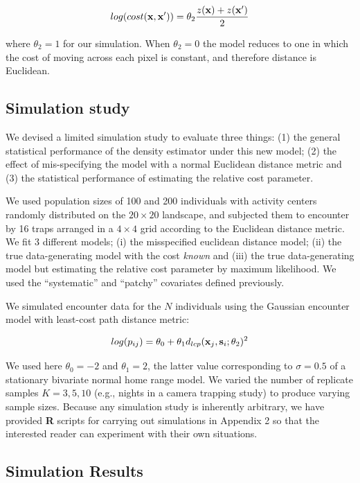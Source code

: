 \documentclass[12pt]{article}
\begin{document}
\begin{spacing}{1.8}
\[
 log(cost({\bf x},{\bf x}'))=  \theta_2 \frac{z({\bf x}) + z({\bf x}')}{2}
\]

{\flushleft where} $\theta_2 = 1$ for our simulation.
When $\theta_2=0$ the
model reduces to one in which the cost of moving across each pixel is
constant, and therefore distance is Euclidean.

\subsection{Simulation study}

We devised a limited simulation study to evaluate three things: (1)
the general statistical performance of the density estimator under
this new model; (2) the effect of mis-specifying the model with a
normal Euclidean distance metric and (3) the statistical performance
of estimating the relative cost parameter.

We used population sizes of 100 and 200 individuals with activity
centers randomly distributed on the $20 \times 20$ landscape, and subjected them
to encounter by 16 traps arranged in a $4\times 4$ grid according to
the Euclidean distance metric. We fit 3 different models; (i) the
misspecified euclidean distance model; (ii) the true data-generating
model with the cost {\it known} and (iii) the true
data-generating model but estimating the relative cost parameter by
maximum likelihood.  We used the ``systematic'' and ``patchy''
covariates defined previously.

We simulated encounter data for the $N$ individuals using the Gaussian
encounter model with least-cost path distance metric:

\[
log(p_{ij})= \theta_{0} + \theta_{1} d_{lcp}({\bf x}_{j},{\bf
  s}_{i}; \theta_{2})^{2}
\]

{\flushleft We } used here $\theta_{0} = -2$ and $\theta_{1} = 2$, the latter value
corresponding to $\sigma = 0.5$ of a stationary bivariate normal home
range model.  We varied the number of replicate samples $K=3,5,10$
(e.g., nights in a camera trapping study) to produce varying sample
sizes.  Because any simulation study is inherently arbitrary, we have
provided {\bf R} scripts for carrying out simulations in Appendix 2 so
that the interested reader can experiment with their own situations.




\subsection{Simulation Results}


\end{spacing}
\end{document}

